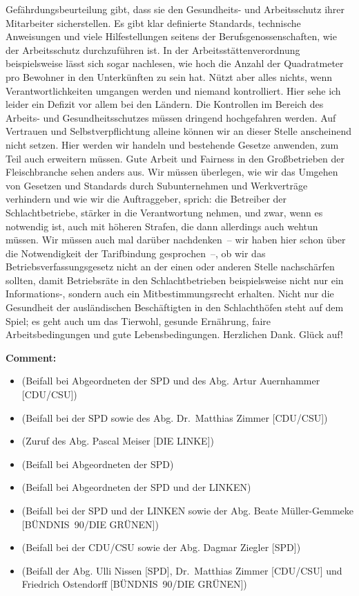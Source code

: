 \documentclass{article}
\begin{document}
Gefährdungsbeurteilung gibt, dass sie den Gesundheits- und Arbeitsschutz ihrer Mitarbeiter sicherstellen. Es gibt klar definierte Standards, technische Anweisungen und viele Hilfestellungen seitens der Berufsgenossenschaften, wie der Arbeitsschutz durchzuführen ist. In der Arbeitsstättenverordnung beispielsweise lässt sich sogar nachlesen, wie hoch die Anzahl der Quadratmeter pro Bewohner in den Unterkünften zu sein hat. Nützt aber alles nichts, wenn Verantwortlichkeiten umgangen werden und niemand kontrolliert. Hier sehe ich leider ein Defizit vor allem bei den Ländern. Die Kontrollen im Bereich des Arbeits- und Gesundheitsschutzes müssen dringend hochgefahren werden. Auf Vertrauen und Selbstverpflichtung alleine können wir an dieser Stelle anscheinend nicht setzen.  Hier werden wir handeln und bestehende Gesetze anwenden, zum Teil auch erweitern müssen. Gute Arbeit und Fairness in den Großbetrieben der Fleischbranche sehen anders aus.  Wir müssen überlegen, wie wir das Umgehen von Gesetzen und Standards durch Subunternehmen und Werkverträge verhindern und wie wir die Auftraggeber, sprich: die Betreiber der Schlachtbetriebe, stärker in die Verantwortung nehmen, und zwar, wenn es notwendig ist, auch mit höheren Strafen, die dann allerdings auch wehtun müssen.  Wir müssen auch mal darüber nachdenken – wir haben hier schon über die Notwendigkeit der Tarifbindung gesprochen –, ob wir das Betriebsverfassungsgesetz nicht an der einen oder anderen Stelle nachschärfen sollten, damit Betriebsräte in den Schlachtbetrieben beispielsweise nicht nur ein Informations-, sondern auch ein Mitbestimmungsrecht erhalten.  Nicht nur die Gesundheit der ausländischen Beschäftigten in den Schlachthöfen steht auf dem Spiel; es geht auch um das Tierwohl, gesunde Ernährung, faire Arbeitsbedingungen und gute Lebensbedingungen. Herzlichen Dank. Glück auf!  

\noindent\textbf{Comment:}
\begin{itemize}
    \setlength\itemsep{-3pt}
    \item (Beifall bei Abgeordneten der SPD und des Abg. Artur Auernhammer [CDU/CSU])
    \setlength\itemsep{-3pt}
    \item (Beifall bei der SPD sowie des Abg. Dr. Matthias Zimmer [CDU/CSU])
    \setlength\itemsep{-3pt}
    \item (Zuruf des Abg. Pascal Meiser [DIE LINKE])
    \setlength\itemsep{-3pt}
    \item (Beifall bei Abgeordneten der SPD)
    \setlength\itemsep{-3pt}
    \item (Beifall bei Abgeordneten der SPD und der LINKEN)
    \setlength\itemsep{-3pt}
    \item (Beifall bei der SPD und der LINKEN sowie der Abg. Beate Müller-Gemmeke [BÜNDNIS 90/DIE GRÜNEN])
    \setlength\itemsep{-3pt}
    \item (Beifall bei der CDU/CSU sowie der Abg. Dagmar Ziegler [SPD])
    \setlength\itemsep{-3pt}
    \item (Beifall der Abg. Ulli Nissen [SPD], Dr. Matthias Zimmer [CDU/CSU] und Friedrich Ostendorff [BÜNDNIS 90/DIE GRÜNEN])
\end{itemize}
\end{document}
